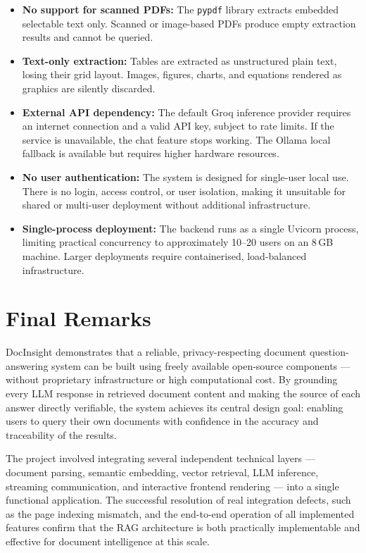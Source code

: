\begin{itemize}
    \item \textbf{No support for scanned PDFs:} The \texttt{pypdf} library
    extracts embedded selectable text only. Scanned or image-based PDFs produce
    empty extraction results and cannot be queried.

    \item \textbf{Text-only extraction:} Tables are extracted as unstructured
    plain text, losing their grid layout. Images, figures, charts, and equations
    rendered as graphics are silently discarded.

    \item \textbf{External API dependency:} The default Groq inference provider
    requires an internet connection and a valid API key, subject to rate limits.
    If the service is unavailable, the chat feature stops working. The Ollama
    local fallback is available but requires higher hardware resources.

    \item \textbf{No user authentication:} The system is designed for single-user
    local use. There is no login, access control, or user isolation, making it
    unsuitable for shared or multi-user deployment without additional infrastructure.

    \item \textbf{Single-process deployment:} The backend runs as a single
    Uvicorn process, limiting practical concurrency to approximately 10--20 users
    on an 8\,GB machine. Larger deployments require containerised, load-balanced
    infrastructure.
\end{itemize}

\section{Final Remarks}

DocInsight demonstrates that a reliable, privacy-respecting document
question-answering system can be built using freely available open-source
components --- without proprietary infrastructure or high computational cost.
By grounding every LLM response in retrieved document content and making the
source of each answer directly verifiable, the system achieves its central
design goal: enabling users to query their own documents with confidence in
the accuracy and traceability of the results.

The project involved integrating several independent technical layers ---
document parsing, semantic embedding, vector retrieval, LLM inference,
streaming communication, and interactive frontend rendering --- into a single
functional application. The successful resolution of real integration defects,
such as the page indexing mismatch, and the end-to-end operation of all
implemented features confirm that the RAG architecture is both practically
implementable and effective for document intelligence at this scale.